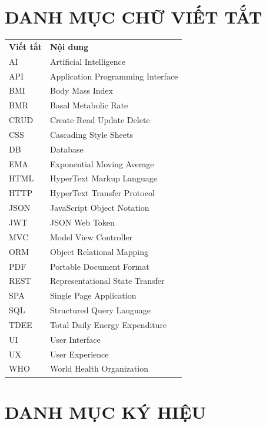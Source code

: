 \documentclass[12pt, a4paper]{report}
\begin{document}
\chapter*{DANH MỤC CHỮ VIẾT TẮT}

\noindent
\begin{tabular}{p{3cm} p{11cm}}
\textbf{Viết tắt} & \textbf{Nội dung} \\[0.2cm]
AI & Artificial Intelligence \\[0.15cm]
API & Application Programming Interface \\[0.15cm]
BMI & Body Mass Index \\[0.15cm]
BMR & Basal Metabolic Rate \\[0.15cm]
CRUD & Create Read Update Delete \\[0.15cm]
CSS & Cascading Style Sheets \\[0.15cm]
DB & Database \\[0.15cm]
EMA & Exponential Moving Average \\[0.15cm]
HTML & HyperText Markup Language \\[0.15cm]
HTTP & HyperText Transfer Protocol \\[0.15cm]
JSON & JavaScript Object Notation \\[0.15cm]
JWT & JSON Web Token \\[0.15cm]
MVC & Model View Controller \\[0.15cm]
ORM & Object Relational Mapping \\[0.15cm]
PDF & Portable Document Format \\[0.15cm]
REST & Representational State Transfer \\[0.15cm]
SPA & Single Page Application \\[0.15cm]
SQL & Structured Query Language \\[0.15cm]
TDEE & Total Daily Energy Expenditure \\[0.15cm]
UI & User Interface \\[0.15cm]
UX & User Experience \\[0.15cm]
WHO & World Health Organization \\
\end{tabular}
\clearpage

\chapter*{DANH MỤC KÝ HIỆU}
\end{document}

